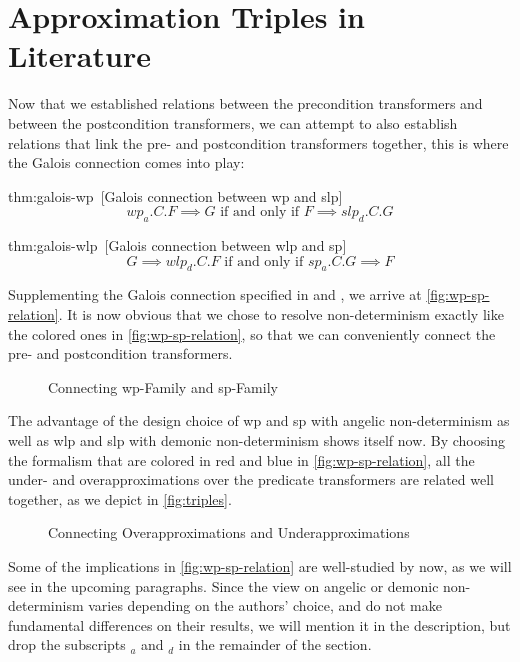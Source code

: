 \section{Approximation Triples in Literature}\label{sec:literature} 
Now that we established relations between the precondition transformers and between the postcondition transformers, we can attempt to also establish relations that link the pre- and postcondition transformers together, this is where the Galois connection comes into play: 

\begin{theorem}{thm:galois-wp}~\cite{zhang22}[Galois connection between wp and slp]
	$$wp_a.C.F \implies G \text{ if and only if }F\implies slp_d.C.G$$
\end{theorem}

\begin{theorem}{thm:galois-wlp}~\cite{zhang22}[Galois connection between wlp and sp]
	$$G \implies wlp_d.C.F \text{ if and only if } sp_a.C.G\implies F$$
\end{theorem}

Supplementing the Galois connection specified in  and , we arrive at \autoref{fig:wp-sp-relation}. 
It is now obvious that we chose to resolve non-determinism exactly like the colored ones in \autoref{fig:wp-sp-relation}, so that we can conveniently connect the pre- and postcondition transformers. 

\begin{figure}[ht]
	\centering
	
	\caption{Connecting wp-Family and sp-Family}
	\label{fig:wp-sp-relation}
\end{figure}

The advantage of the design choice of wp and sp with angelic non-determinism as well as wlp and slp with demonic non-determinism shows itself now. 
By choosing the formalism that are colored in red and blue in \autoref{fig:wp-sp-relation}, all the under- and overapproximations over the predicate transformers are related well together, as we depict in \autoref{fig:triples}.
\begin{figure}[h]
	\centering
	
	\caption{Connecting Overapproximations and Underapproximations}
	\label{fig:triples}
\end{figure}

Some of the implications in \autoref{fig:wp-sp-relation} are well-studied by now, as we will see in the upcoming paragraphs. 
Since the view on angelic or demonic non-determinism varies depending on the authors' choice, and do not make fundamental differences on their results, we will mention it in the description, but drop the subscripts $_a$ and $_d$ in the remainder of the section. 

